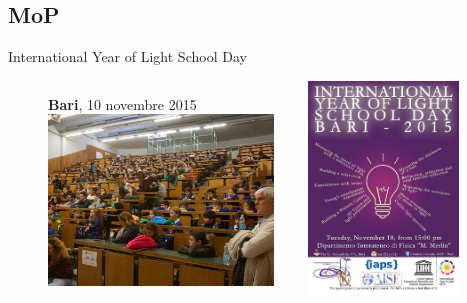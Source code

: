 \documentclass{Bredelebeamer}
\begin{document}
\subsection{MoP}
\begin{frame}{International Year of Light School Day}
\begin{figure}
\begin{columns}
\begin{column}{0.5\textwidth}
\vspace{1mm}
\centering 
\textbf{Bari}, 10 novembre 2015 \\ \vspace{0.5cm}
\includegraphics[width=6cm]{images/SD22.jpg}
\end{column}
\begin{column}{0.5\textwidth}\centering
\includegraphics[width=4cm]{images/SD1.jpg}
\end{column}
\end{columns}
\end{figure}
\end{frame}
\end{document}
